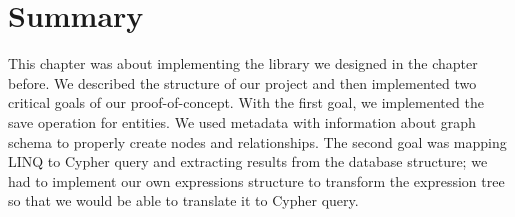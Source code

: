 \section{Summary}

This chapter was about implementing the library we designed in the chapter before. We described the structure of our project and then implemented
two critical goals of our proof-of-concept. With the first goal, we implemented the save operation for entities. We used metadata with information about graph
schema to properly create nodes and relationships. The second goal was mapping LINQ to Cypher query and extracting results from the database structure; we had to implement our own expressions structure to transform the expression tree so that we would be able to translate it to Cypher query.


